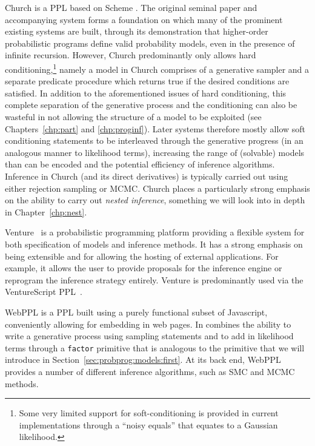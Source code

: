 Church is a PPL based on Scheme \citep{goodman_uai_2008}.  
The original seminal paper and accompanying system 
	forms a foundation on which many of the prominent existing systems are built, through its
	demonstration that higher-order probabilistic programs define valid probability models, even in
	the presence of infinite recursion.  However, Church predominantly only allows hard
		conditioning,\footnote{Some very limited support for soft-conditioning is provided in current
		implementations through a ``noisy equals'' that equates to a Gaussian likelihood.}
	namely a model in Church comprises of a generative sampler and a separate predicate procedure
	which returns true if the desired conditions are satisfied.  
	In addition to the aforementioned issues of hard conditioning, this complete separation of the 
	generative process and the conditioning can also be wasteful in not allowing the structure of a 
	model to be exploited (see Chapters~\ref{chp:part} and \ref{chp:proginf}).  
	Later systems therefore mostly allow soft conditioning statements to be interleaved
	through the generative progress (in an analogous manner to likelihood terms), increasing the range
	of (solvable) models than can be encoded and the potential efficiency of inference algorithms.
	Inference in Church (and its direct derivatives) is typically carried out using either rejection sampling
	or MCMC.  Church places a particularly strong emphasis on the ability to carry out \emph{nested inference},
	something we will look into in depth in Chapter~\ref{chp:nest}.

Venture~\citep{mansinghka2014venture} is a probabilistic programming platform providing a flexible
system for both specification of models and inference methods.  It has a strong emphasis on being extensible
and for allowing the hosting of external applications.  For example, it allows the user to provide proposals for
the inference engine or reprogram the inference strategy entirely.  Venture is predominantly used via the
VentureScript PPL~\citep{mansinghka2014venture}.

WebPPL \citep{goodman_book_2014} is a PPL built using a purely functional subset of Javascript,
conveniently allowing for embedding in web pages.
In combines the ability to write a generative process using sampling statements and to add in likelihood
terms through a {\small \texttt{factor}} primitive that is analogous to the \observe primitive that we will introduce
in Section~\ref{sec:probprog:models:first}.  At its back end, WebPPL provides a number of different inference
algorithms, such as SMC and MCMC methods.

